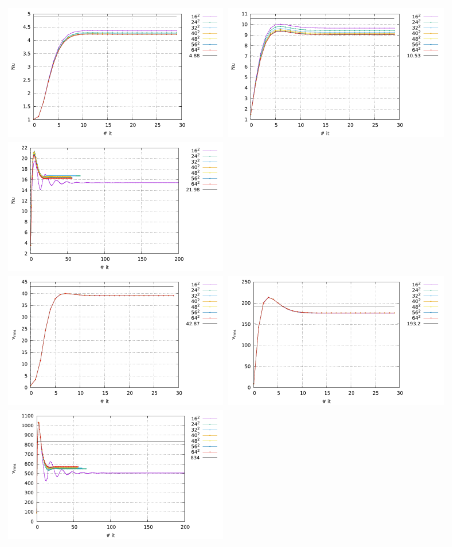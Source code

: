 \begin{center}
\includegraphics[width=5.7cm]{python_codes/fieldstone_110/results_EBA/Nu_Ra1e4.pdf}
\includegraphics[width=5.7cm]{python_codes/fieldstone_110/results_EBA/Nu_Ra1e5.pdf}
\includegraphics[width=5.7cm]{python_codes/fieldstone_110/results_EBA/Nu_Ra1e6.pdf}\\
\includegraphics[width=5.7cm]{python_codes/fieldstone_110/results_EBA/vrms_Ra1e4.pdf}
\includegraphics[width=5.7cm]{python_codes/fieldstone_110/results_EBA/vrms_Ra1e5.pdf}
\includegraphics[width=5.7cm]{python_codes/fieldstone_110/results_EBA/vrms_Ra1e6.pdf}\\

\end{center}
